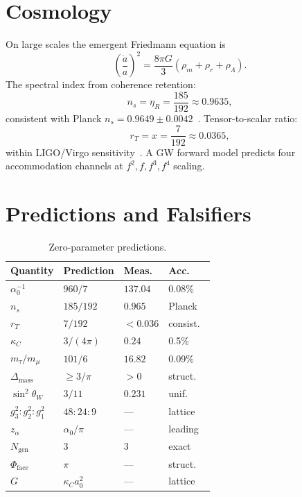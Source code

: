 \documentclass[11pt,twocolumn]{article}
\begin{document}
\section{Cosmology}
\label{sec:cosmology}

On large scales the emergent Friedmann equation is
\begin{equation}
\left(\frac{\dot a}{a}\right)^2 = \frac{8\pi G}{3}(\rho_m+\rho_r+\rho_\Lambda).
\label{eq:friedmann}
\end{equation}
The spectral index from coherence retention:
\begin{equation}
n_s = \eta_R = \frac{185}{192}\approx 0.9635,
\label{eq:ns}
\end{equation}
consistent with Planck $n_s=0.9649\pm 0.0042$~\cite{planck2018}.
Tensor-to-scalar ratio:
\begin{equation}
r_T = x = \frac{7}{192}\approx 0.0365,
\label{eq:rT}
\end{equation}
within LIGO/Virgo sensitivity~\cite{ligo2016}.
A GW forward model predicts four accommodation channels at $f^2,f,f^3,f^4$ scaling.

\section{Predictions and Falsifiers}
\label{sec:predictions}

\begin{table}[t]
\centering
\caption{Zero-parameter predictions.}
\label{tab:predictions}
\small
\begin{tabular}{@{}l@{\hskip 5pt}l@{\hskip 5pt}l@{\hskip 5pt}l@{}}
\toprule
Quantity & Prediction & Meas.\ & Acc.\ \\
\midrule
$\alpha_0^{-1}$ & $960/7$ & $137.04$ & 0.08\% \\
$n_s$ & $185/192$ & $0.965$ & Planck \\
$r_T$ & $7/192$ & ${<}0.036$ & consist.\ \\
$\kappa_C$ & $3/(4\pi)$ & $0.24$ & 0.5\% \\
$m_\tau/m_\mu$ & $101/6$ & $16.82$ & 0.09\% \\
$\Delta_{\mathrm{mass}}$ & ${\geq}3/\pi$ & ${>}0$ & struct.\ \\
$\sin^2\theta_W$ & $3/11$ & $0.231$ & unif.\ \\
$g_3^2{:}g_2^2{:}g_1^2$ & $48{:}24{:}9$ & --- & lattice \\
$z_\alpha$ & $\alpha_0/\pi$ & --- & leading \\
$N_{\mathrm{gen}}$ & $3$ & $3$ & exact \\
$\Phi_{\mathrm{face}}$ & $\pi$ & --- & struct.\ \\
$G$ & $\kappa_C a_0^2$ & --- & lattice \\
\bottomrule
\end{tabular}
\end{table}
\end{document}
